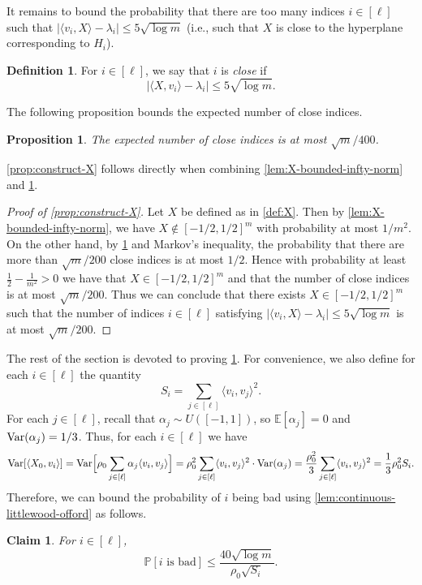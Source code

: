 \documentclass[reqno]{amsart}
\newtheorem{claim}[theorem]{Claim}
\newtheorem{prop}[theorem]{Proposition}
\theoremstyle{remark}
\theoremstyle{definition}
\newtheorem{definition}[theorem]{Definition}
\numberwithin{theorem}{section}
\renewcommand{\(}{\bigl(}
\renewcommand{\)}{\bigr)\vphantom{)}}
\newcommand{\E}{\mathbb{E}}
\renewcommand{\le}{\leqslant}
\renewcommand{\P}{\mathbb{P}}
\newcommand{\ang}[1]{\langle#1\rangle}
\newcommand{\var}{\textup{Var}}
\newcommand{\unif}{U([-1,1])}
\begin{document}
It remains to bound the probability that there are too many indices $i\in [\ell]$ such that $|\ang{v_i,X}-\lambda_i| \le 5\sqrt{\log m}$ (i.e., such that $X$ is close to the hyperplane corresponding to $H_i$).


\begin{definition}\label{def:xclose}
    For $i\in [\ell]$, we say that $i$ is \emph{close} if 
    \[|\ang{X,v_i} - \lambda_i|\le 5\sqrt{\log m}.\]
\end{definition}

The following proposition bounds the expected number of close indices. 
\begin{prop}\label{prop:expected-size-F}
    The expected number of close indices is at most $\sqrt{m}/400$.
\end{prop}

\cref{prop:construct-X} follows directly when combining \cref{lem:X-bounded-infty-norm} and \cref{prop:expected-size-F}.
\begin{proof}[Proof of \cref{prop:construct-X}]
    Let $X$ be defined as in \cref{def:X}. Then by \cref{lem:X-bounded-infty-norm}, we have $X\not\in [-1/2,1/2]^m$ with probability at most $1/m^2$. On the other hand, by \cref{prop:expected-size-F} and Markov's inequality, the probability that there are more than $\sqrt{m}/200$ close indices is at most $1/2$. Hence with probability at least $\frac{1}{2}- \frac{1}{m^2} > 0$ we have that $X\in [-1/2,1/2]^m$ and that the number of close indices is at most $\sqrt{m}/200$. Thus we can conclude that there exists $X\in [-1/2,1/2]^m$ such that the number of indices $i\in [\ell]$ satisfying $|\ang{v_i,X}-\lambda_i|\le 5\sqrt{\log m}$ is at most $\sqrt{m}/200$.
\end{proof}


The rest of the section is devoted to proving \cref{prop:expected-size-F}. For convenience, we also define for each $i\in [\ell]$ the quantity
\[
    S_i = \sum_{j\in [\ell]}\ang{v_i, v_j}^2.
\]
For each $j\in [\ell]$, recall that $\alpha_j\sim \unif$, so $\E[\alpha_j] = 0$ and $\var(\alpha_j) = 1/3$. Thus, for each $i\in [\ell]$ we have 
\begin{equation}\label{eq:var}
    \var[\ang{X_0, v_i}] = \var\Big[\rho_0\sum_{j\in [\ell]}\alpha_j\ang{v_i,v_j}\Big] = \rho_0^2\sum_{j\in [\ell]}\ang{v_i,v_j}^2\cdot \var(\alpha_j) =\frac{\rho_0^2}{3}\sum_{j\in [\ell]}\ang{v_i,v_j}^2 = \frac{1}{3}\rho_0^2S_i.
\end{equation}
Therefore, we can bound the probability of $i$ being bad using \cref{lem:continuous-littlewood-offord} as follows.
\begin{claim}\label{claim:prob-i-bad}
    For $i\in [\ell]$, 
\[\P[i \text{ is bad}] \le \frac{40\sqrt{\log m}}{\rho_0\sqrt{S_i}}.\]
\end{claim}
\end{document}
